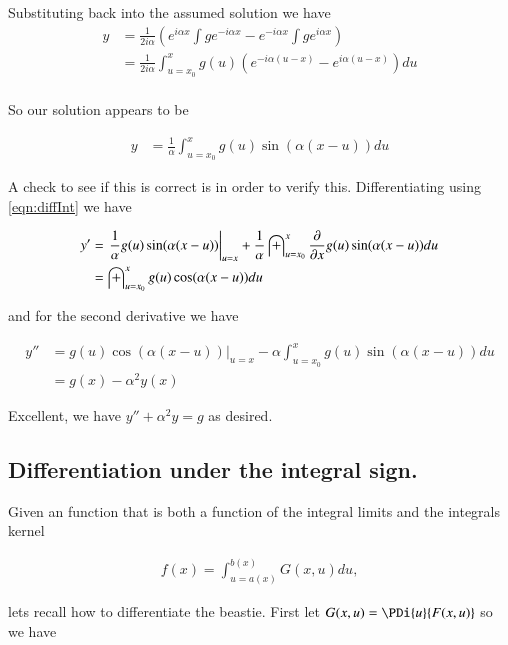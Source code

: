 \documentclass{article}
\begin{document}
Substituting back into the assumed solution we have
\begin{align*}
y 
&= \frac{1}{2 i \alpha} \left(
  e^{ i \alpha x } \int g e^{ -i \alpha x } 
- e^{ -i \alpha x } \int g e^{ i \alpha x } 
\right) \\
&= \frac{1}{2 i \alpha} \int_{u=x_0}^x g(u) \left( e^{ -i \alpha (u-x) } -e^{ i \alpha (u-x) } \right) du \\
\end{align*}

So our solution appears to be

\begin{align}\label{eqn:solutionToWaveNumberDomainEquation}
y &= \frac{1}{\alpha} \int_{u=x_0}^x g(u) \sin( \alpha(x-u) ) du
\end{align}

A check to see if this is correct is in order to verify this.  Differentiating using \ref{eqn:diffInt} we have

\begin{align*}
y' 
&= 
{\left. 
\frac{1}{\alpha} 
g(u) \sin( \alpha(x-u) ) \right\vert}_{u=x}
+\frac{1}{\alpha} \int_{u=x_0}^x \frac{\partial {}}{\partial {x}} g(u) \sin( \alpha(x-u) ) du \\
&= \int_{u=x_0}^x g(u) \cos( \alpha(x-u) ) du \\
\end{align*}

and for the second derivative we have

\begin{align*}
y''
&= 
{\left. g(u) \cos( \alpha(x-u) ) \right\vert}_{u=x}
- \alpha \int_{u=x_0}^x g(u) \sin( \alpha(x-u) ) du \\
&= g(x) - \alpha^2 y(x)
\end{align*}

Excellent, we have $y'' + \alpha^2 y = g$ as desired.

\subsection{ Differentiation under the integral sign. }

Given an function that is both a function of the integral limits and the integrals kernel

\begin{align*}
f(x) = \int_{u = a(x)}^{b(x)} G(x,u) du,
\end{align*}

lets recall how to differentiate the beastie.  First let $G(x,u) = \PDi{u}{F(x,u)}$ so we have
\end{document}
